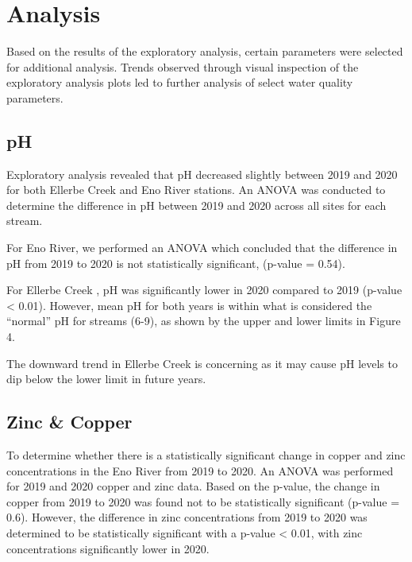 \documentclass[
  12pt,
]{article}
\begin{document}
\newpage

\hypertarget{analysis}{%
\section{Analysis}\label{analysis}}

Based on the results of the exploratory analysis, certain parameters
were selected for additional analysis. Trends observed through visual
inspection of the exploratory analysis plots led to further analysis of
select water quality parameters.

\hypertarget{ph}{%
\subsection{pH}\label{ph}}

Exploratory analysis revealed that pH decreased slightly between 2019
and 2020 for both Ellerbe Creek and Eno River stations. An ANOVA was
conducted to determine the difference in pH between 2019 and 2020 across
all sites for each stream.

For Eno River, we performed an ANOVA which concluded that the difference
in pH from 2019 to 2020 is not statistically significant, (p-value =
0.54).

For Ellerbe Creek , pH was significantly lower in 2020 compared to 2019
(p-value \textless{} 0.01). However, mean pH for both years is within
what is considered the ``normal'' pH for streams (6-9), as shown by the
upper and lower limits in Figure 4.

The downward trend in Ellerbe Creek is concerning as it may cause pH
levels to dip below the lower limit in future years.

\hypertarget{zinc-copper}{%
\subsection{Zinc \& Copper}\label{zinc-copper}}

To determine whether there is a statistically significant change in
copper and zinc concentrations in the Eno River from 2019 to 2020. An
ANOVA was performed for 2019 and 2020 copper and zinc data. Based on the
p-value, the change in copper from 2019 to 2020 was found not to be
statistically significant (p-value = 0.6). However, the difference in
zinc concentrations from 2019 to 2020 was determined to be statistically
significant with a p-value \textless{} 0.01, with zinc concentrations
significantly lower in 2020.
\end{document}
